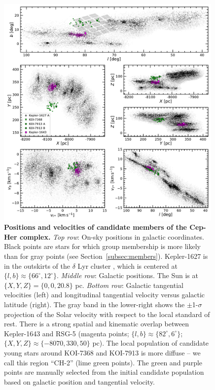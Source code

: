 \documentclass[12pt,twocolumn,linenumbers]{aastex63}
\begin{document}
\begin{figure}[t]
	\begin{center}
		\leavevmode
		\includegraphics[width=0.99\textwidth]{f1.pdf}
	\end{center}
	\vspace{-0.7cm}
	\caption{
  {\bf Positions and velocities of candidate members of the Cep-Her
  complex.}
  {\it Top row}: On-sky positions in galactic coordinates.  Black
  points are stars for which group membership is more likely than for
  gray points (see Section~\ref{subsec:members}).
  Kepler-1627 is in the outskirts of the $\delta$ Lyr cluster
  \citep{bouma_kep1627_2022}, which is centered at $\{ l, b\} \approx
  \{ 66^\circ, 12^\circ\}$.
  {\it Middle row}: Galactic positions.  The Sun is at $\{X, Y, Z\} =
  \{0, 0, 20.8\}$ pc.
  {\it Bottom row}: Galactic tangential velocities (left) and
  longitudinal tangential velocity versus galactic latitude (right).
  The gray band in the lower-right shows the $\pm$1-$\sigma$
  projection of the Solar velocity with respect to the local standard
  of rest.
  There is a strong spatial and kinematic overlap between Kepler-1643
  and RSG-5 (magenta points; $\{ l, b\} \approx \{ 82^\circ,
  6^\circ\}$; $\{ X, Y, Z\} \approx \{-8070, 330, 50\} $ pc).  The
  local population of candidate young stars around KOI-7368 and
  KOI-7913 is more diffuse -- we call this region ``CH-2'' (lime green
  points).  The green and purple points are manually selected from the
  initial candidate population based on galactic position and
  tangential velocity.
	\label{fig:XYZvtang}
	}
\end{figure}
\end{document}
